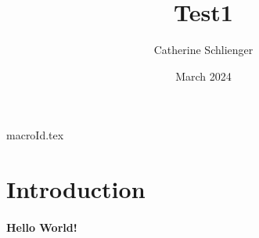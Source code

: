 \documentclass{article}
\title{Test1}
\author{Catherine Schlienger}
\date{March 2024}
\begin{document}
{macroId.tex}


\maketitle

\section{Introduction}
\paragraph{Hello World!}

\GESCHICHTEDERPHILOSOPHIE{}

\HENRIBERGSON{}
\end{document}

